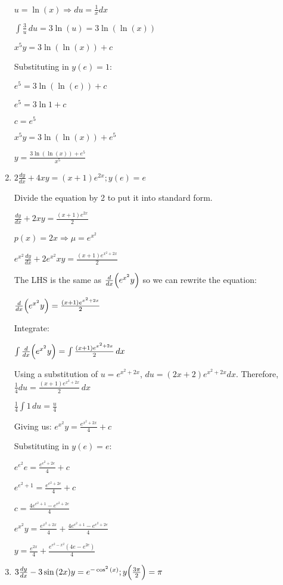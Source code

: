\documentclass[../main.tex]{subfiles}
\begin{document}
\begin{enumerate}[itemsep=0.7cm]
    $u=\ln{(x)} \Rightarrow du=\frac{1}{x}dx$

    $\int \frac{3}{u}\,du=3\ln{(u)}=3\ln{(\ln{(x)})}$

    $x^5y=3\ln{(\ln{(x)})}+c$

    Substituting in $y(e)=1$:

    $e^5=3\ln{(\ln{(e)})}+c$

    $e^5=3\ln{1}+c$

    $c=e^5$

    $x^5y=3\ln{(\ln{(x)})}+e^5$

    $y=\frac{3\ln{(\ln{(x)})}+e^5}{x^5}$

    \item 
    $2\frac{dy}{dx}+4xy=(x+1)e^{2x}; y(e)=e$

    Divide the equation by 2 to put it into standard form.

    $\frac{dy}{dx}+2xy=\frac{(x+1)e^{2x}}{2}$

    $p(x)=2x \Rightarrow \mu=e^{x^2}$

    $e^{x^2}\frac{dy}{dx}+2e^{x^2}xy=\frac{(x+1)e^{x^2+2x}}{2}$

    The LHS is the same as $\frac{d}{dx}\Bigl(e^{x^2}y\Bigr)$ so we can rewrite the equation:

    $\frac{d}{dx}\Bigl(e^{x^2}y\Bigr)=\frac{(x+1)e^{x^2+2x}}{2}$

    Integrate:

    $\int \frac{d}{dx}\Bigl(e^{x^2}y\Bigr)=\int \frac{(x+1)e^{x^2+2x}}{2}\,dx$

    Using a substitution of $u=e^{x^2+2x}$, $du=(2x+2)e^{x^2+2x}dx$. Therefore, $\frac{1}{4}du=\frac{(x+1)e^{x^2+2x}}{2}\,dx$

    $\frac{1}{4}\int 1\,du=\frac{u}{4}$

    Giving us: $e^{x^2}y=\frac{e^{x^2+2x}}{4}+c$

    Substituting in $y(e)=e$:

    $e^{e^2}e=\frac{e^{e^2+2e}}{4}+c$

    $e^{e^2+1}=\frac{e^{e^2+2e}}{4}+c$

    $c=\frac{4e^{e^2+1}-e^{e^2+2e}}{4}$

    $e^{x^2}y=\frac{e^{x^2+2x}}{4}+\frac{4e^{e^2+1}-e^{e^2+2e}}{4}$

    $y=\frac{e^{2x}}{4}+\frac{e^{e^2-x^2}(4e-e^{2e})}{4}$

    \item 
    $3\frac{dy}{dx}-3\sin{(2x)}y=e^{-\cos^2{(x)}}; y\Bigl(\frac{3\pi}{2}\Bigr)=\pi$


\end{enumerate}
\end{document}
